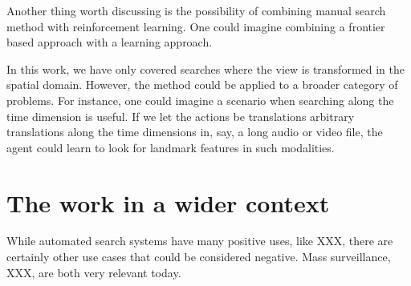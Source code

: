 Another thing worth discussing is the possibility of combining manual search method with reinforcement learning. One could imagine combining a frontier based approach with a learning approach.


In this work, we have only covered searches where the view is transformed in the spatial domain.
However, the method could be applied to a broader category of problems.
For instance, one could imagine a scenario when searching along the time dimension is useful.
If we let the actions be translations arbitrary translations along the time dimensions in, say, a long audio or video file,
the agent could learn to look for landmark features in such modalities.



\section{The work in a wider context}
\label{sec:work-wider-context}

% 


While automated search systems have many positive uses, like XXX, there are certainly other use cases that could be considered negative.
Mass surveillance, XXX, are both very relevant today.